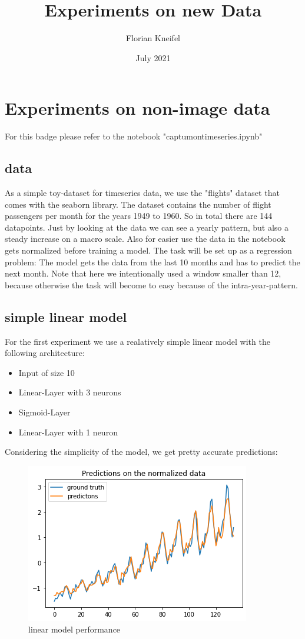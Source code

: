 \documentclass{article}
\title{Experiments on new Data}
\author{Florian Kneifel}
\date{July 2021}
\begin{document}
\section{Experiments on non-image data}
For this badge please refer to the notebook "captum\textunderscore on\textunderscore timeseries.ipynb" 

\subsection{data}
As a simple toy-dataset for timeseries data, we use the "flights" dataset that comes with the seaborn library. The dataset contains the number of flight passengers per month for the years 1949 to 1960. So in total there are 144 datapoints. Just by looking at the data we can see a yearly pattern, but also a steady increase on a macro scale. Also for easier use the data in the notebook gets normalized before training a model. The task will be set up as a regression problem: The model gets the data from the last 10 months and has to predict the next month. Note that here we intentionally used a window smaller than 12, because otherwise the task will become to easy because of the intra-year-pattern.

\subsection{simple linear model}
For the first experiment we use a realatively simple linear model with the following architecture: 
\begin{itemize}
\item Input of size 10
\item Linear-Layer with 3 neurons
\item Sigmoid-Layer
\item Linear-Layer with 1 neuron
\end{itemize}

Considering the simplicity of the model, we get pretty accurate predictions:

\begin{figure}[h!]
\centering
\includegraphics[scale=0.6]{linear_model_prediction}
\caption{linear model performance}
\label{fig:lin_model_perf}
\end{figure}
\end{document}
